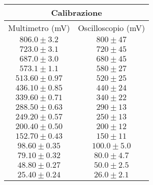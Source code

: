 \documentclass[@MAIN@]{subfiles}
\begin{document}
\begin{tabular}{ ||c|c|| }
  \hline
  \multicolumn{2}{||c||}{Calibrazione}\\
  \hline
  Multimetro (mV) & Oscilloscopio (mV) \\
  \hline
  $806.0\pm 3.2$ & $800\pm 47$ \\
  \hline
  $723.0\pm 3.1$ & $720\pm 45$ \\
  \hline
  $687.0\pm 3.0$ & $680\pm 45$ \\
  \hline
  $573.1\pm 1.1$ & $580\pm 27$ \\
  \hline
  $513.60\pm 0.97$ & $520\pm 25$ \\
  \hline
  $436.10\pm 0.85$ & $440\pm 24$ \\
  \hline
  $339.60\pm 0.71$ & $340\pm 22$ \\
  \hline
  $288.50\pm 0.63$ & $290\pm 13$ \\
  \hline
  $249.20\pm 0.57$ & $250\pm 13$ \\
  \hline
  $200.40\pm 0.50$ & $200\pm 12$ \\
  \hline
  $152.70\pm 0.43$ & $150\pm 11$ \\
  \hline 
  $98.60\pm 0.35$ & $100.0\pm 5.0$ \\
  \hline 
  $79.10\pm 0.32$ & $80.0\pm 4.7$ \\
  \hline 
  $48.80\pm 0.27$ & $50.0\pm 2.5$ \\
  \hline 
  $25.40\pm 0.24$ & $26.0\pm 2.1$ \\
  \hline 
  
  
  \end{tabular}   
\end{document}
